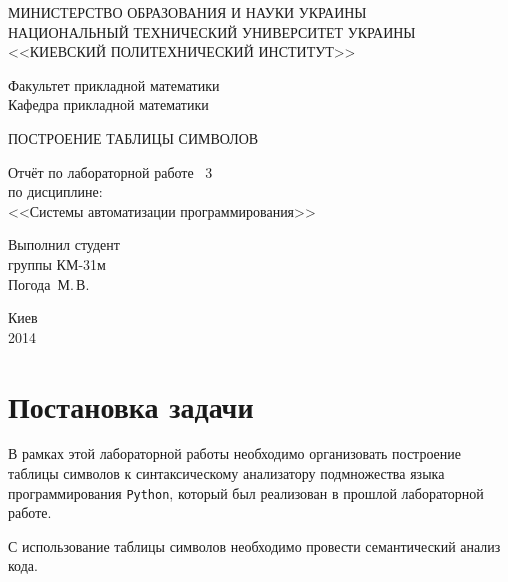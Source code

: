 \documentclass[a4paper,12pt,notitlepage,pdftex]{scrreprt}
\begin{document}
\begin{titlepage}
    \begin{center}
        \MakeUppercase{Министерство образования и науки Украины}\\
        \MakeUppercase{Национальный технический университет Украины}\\
        \MakeUppercase{<<Киевский политехнический институт>>}\\
        \vspace*{2em}

        Факультет прикладной математики\\
        Кафедра прикладной математики

        \vfill

        \MakeUppercase{Построение таблицы символов}\\
        \vspace*{2em}

        Отчёт по лабораторной работе \textnumero~3\\
        по дисциплине:\\
        <<Системы автоматизации программирования>>
    \end{center}

    \vfill
    \hfill\begin{minipage}{0.3\textwidth}
        Выполнил студент\\
        группы КМ-31м\\
        Погода~М.\,В.
    \end{minipage}

    \vfill
    \begin{center}
        Киев\\
        2014
    \end{center}
\end{titlepage}

\tableofcontents

\chapter{Постановка задачи}
\label{chap:first}
    В рамках этой лабораторной работы необходимо организовать построение таблицы символов к синтаксическому
    анализатору подмножества языка программирования \texttt{Python}, который был реализован в прошлой лабораторной
    работе.

    С использование таблицы символов необходимо провести семантический анализ кода.
\end{document}
